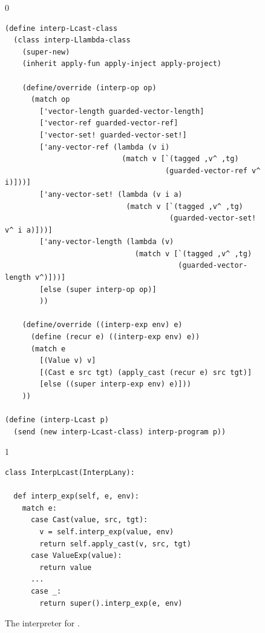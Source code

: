 \documentclass[7x10]{TimesAPriori_MIT}%
\def\racketEd{0}
\def\pythonEd{1}
\def\edition{0}
\numberwithin{theorem}{chapter}
\numberwithin{definition}{chapter}
\numberwithin{equation}{chapter}
\begin{document}
\begin{figure}[tbp]
\begin{tcolorbox}[colback=white]  
{\if\edition\racketEd    
\begin{lstlisting}[basicstyle=\ttfamily\footnotesize]
(define interp-Lcast-class
  (class interp-Llambda-class
    (super-new)
    (inherit apply-fun apply-inject apply-project)

    (define/override (interp-op op)
      (match op
        ['vector-length guarded-vector-length]
        ['vector-ref guarded-vector-ref]
        ['vector-set! guarded-vector-set!]
        ['any-vector-ref (lambda (v i)
                           (match v [`(tagged ,v^ ,tg)
                                     (guarded-vector-ref v^ i)]))]
        ['any-vector-set! (lambda (v i a)
                            (match v [`(tagged ,v^ ,tg)
                                      (guarded-vector-set! v^ i a)]))]
        ['any-vector-length (lambda (v)
                              (match v [`(tagged ,v^ ,tg)
                                        (guarded-vector-length v^)]))]
        [else (super interp-op op)]
        ))

    (define/override ((interp-exp env) e)
      (define (recur e) ((interp-exp env) e))
      (match e
        [(Value v) v]
        [(Cast e src tgt) (apply_cast (recur e) src tgt)]
        [else ((super interp-exp env) e)]))
    ))

(define (interp-Lcast p)
  (send (new interp-Lcast-class) interp-program p))
\end{lstlisting}
\fi}
{\if\edition\pythonEd
\begin{lstlisting}[basicstyle=\ttfamily\footnotesize]
class InterpLcast(InterpLany):

  def interp_exp(self, e, env):
    match e:
      case Cast(value, src, tgt):
        v = self.interp_exp(value, env)
        return self.apply_cast(v, src, tgt)
      case ValueExp(value):
        return value
      ...
      case _:
        return super().interp_exp(e, env)
\end{lstlisting}
\fi}
\end{tcolorbox}

\caption{The interpreter for \LangCast{}.}
  \label{fig:interp-Lcast}
\end{figure}
\end{document}
